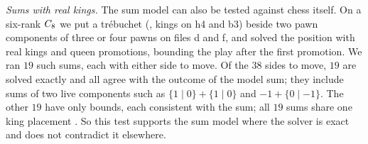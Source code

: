 \emph{Sums with real kings.} The sum model can also be tested against chess itself. On a six-rank $C_{8}$ we
put a tr\'ebuchet (, kings on h4 and b3) beside two pawn components of three or four pawns on
files d and f, and solved the position with real kings and queen promotions, bounding the play after the first
promotion. We ran $19$ such sums, each with either side to move. Of the $38$ sides to move, $19$ are solved exactly
and all agree with the outcome of the model sum; they include sums of two live components such as
$\{1\mid0\}+\{1\mid0\}$ and $-1+\{0\mid-1\}$. The other $19$ have only bounds, each consistent with the
sum; all $19$ sums share one king placement . So this test supports the sum
model where the solver is exact and does not contradict it elsewhere.
